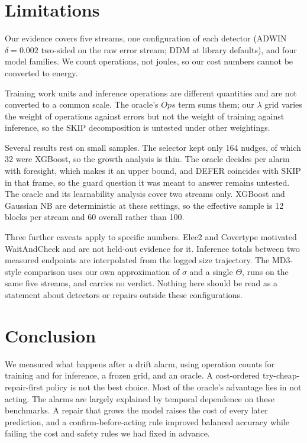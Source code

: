\documentclass[conference]{IEEEtran}
\begin{document}
\section{Limitations}

Our evidence covers five streams, one configuration of each detector (ADWIN
$\delta=0.002$ two-sided on the raw error stream; DDM at library defaults), and
four model families. We count operations, not joules, so our cost numbers cannot
be converted to energy.

Training work units and inference operations are different quantities and are not
converted to a common scale. The oracle's $\textit{Ops}$ term sums them; our
$\lambda$ grid varies the weight of operations against errors but not the weight
of training against inference, so the SKIP decomposition is untested under other
weightings.

Several results rest on small samples. The selector kept only 164 nudges, of
which 32 were XGBoost, so the growth analysis is thin. The oracle decides per
alarm with foresight, which makes it an upper bound, and DEFER coincides with
SKIP in that frame, so the guard question it was meant to answer remains
untested. The oracle and its learnability analysis cover two streams only.
XGBoost and Gaussian NB are deterministic at these settings, so the effective
sample is 12 blocks per stream and 60 overall rather than 100.

Three further caveats apply to specific numbers. Elec2 and Covertype motivated
WaitAndCheck and are not held-out evidence for it. Inference totals between two
measured endpoints are interpolated from the logged size trajectory. The
MD3-style comparison uses our own approximation of $\sigma$ and a single
$\Theta$, runs on the same five streams, and carries no verdict. Nothing here
should be read as a statement about detectors or repairs outside these
configurations.

\section{Conclusion}

We measured what happens after a drift alarm, using operation counts for training
and for inference, a frozen grid, and an oracle. A cost-ordered
try-cheap-repair-first policy is not the best choice. Most of the oracle's
advantage lies in not acting. The alarms are largely explained by temporal
dependence on these benchmarks. A repair that grows the model raises the cost of
every later prediction, and a confirm-before-acting rule improved balanced accuracy
while failing the cost and safety rules we had fixed in advance.
\end{document}
